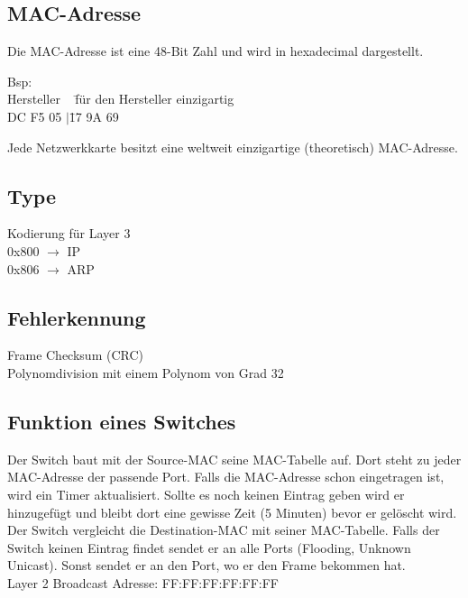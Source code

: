 \subsection*{MAC-Adresse}
Die MAC-Adresse ist eine 48-Bit Zahl und wird in hexadecimal dargestellt.
\begin{tabbing}
	Bsp:\\
	Hersteller ~ \= für den Hersteller einzigartig \\
	DC F5 05 $\vert$\= 17 9A 69 \\
\end{tabbing}

Jede Netzwerkkarte besitzt eine weltweit einzigartige (theoretisch) MAC-Adresse.

\subsection*{Type}
Kodierung für Layer 3 \\
0x800 $\rightarrow$ IP \\
0x806 $\rightarrow$ ARP 

\subsection*{Fehlerkennung}
Frame Checksum (CRC) \\
Polynomdivision mit einem Polynom von Grad 32

\subsection*{Funktion eines Switches}
Der Switch baut mit der Source-MAC seine MAC-Tabelle auf. Dort steht zu jeder MAC-Adresse der passende Port. Falls die MAC-Adresse schon eingetragen ist, wird ein Timer aktualisiert. Sollte es noch keinen Eintrag geben wird er hinzugefügt und bleibt dort eine gewisse Zeit (5 Minuten) bevor er gelöscht wird. Der Switch vergleicht die Destination-MAC mit seiner MAC-Tabelle. Falls der Switch keinen Eintrag findet sendet er an alle Ports (Flooding, Unknown Unicast). Sonst sendet er an den Port, wo er den Frame bekommen hat. \\
Layer 2 Broadcast Adresse: FF:FF:FF:FF:FF:FF

